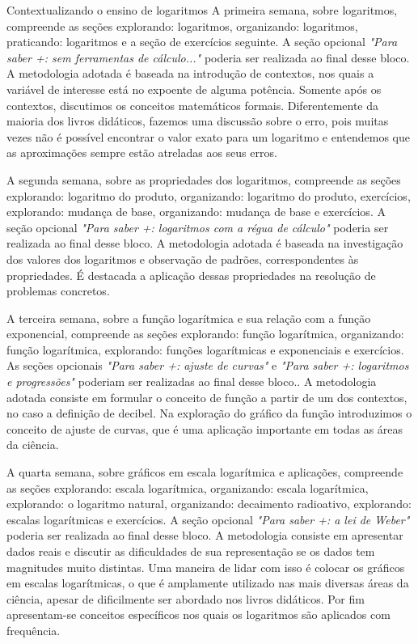 \begin{apresentacao}{Contextualizando o ensino de logaritmos}
A primeira semana, sobre logaritmos, compreende as seções explorando: logaritmos, organizando: logaritmos, praticando: logaritmos e a seção de exercícios seguinte. A seção opcional \textit{"Para saber +: sem ferramentas de cálculo..."} poderia ser realizada ao final desse bloco. A metodologia adotada é baseada na introdução de contextos, nos quais a variável de interesse está no expoente de alguma potência. Somente após os contextos, discutimos os conceitos matemáticos formais. Diferentemente da maioria dos livros didáticos, fazemos uma discussão sobre o erro, pois muitas vezes não é possível encontrar o valor exato para um logaritmo e entendemos que as aproximações sempre estão atreladas aos seus erros.

A segunda semana, sobre as propriedades dos logaritmos, compreende as seções explorando: logaritmo do produto, organizando: logaritmo do produto, exercícios, explorando: mudança de base, organizando: mudança de base e exercícios. A seção opcional \textit{"Para saber +: logaritmos com a régua de cálculo"} poderia ser realizada ao final desse bloco. A metodologia adotada é baseada na investigação dos valores dos logaritmos e observação de padrões, correspondentes às propriedades. É destacada a aplicação dessas propriedades na resolução de problemas concretos.

A terceira semana, sobre a função logarítmica e sua relação com a função exponencial, compreende as seções explorando: função logarítmica, organizando: função logarítmica, explorando: funções logarítmicas e exponenciais e exercícios. As seções opcionais \textit{"Para saber +: ajuste de curvas"} e \textit{"Para saber +: logaritmos e progressões"} poderiam ser realizadas ao final desse bloco.. A metodologia adotada consiste em formular o conceito de função a partir de um dos contextos, no caso a definição de decibel. Na exploração do gráfico da função introduzimos o conceito de ajuste de curvas, que é uma aplicação importante em todas as áreas da ciência.

A quarta semana, sobre gráficos em escala logarítmica e aplicações, compreende as seções explorando: escala logarítmica, organizando: escala logarítmica, explorando: o logaritmo natural, organizando: decaimento radioativo, explorando: escalas logarítmicas e exercícios. A seção opcional \textit{"Para saber +: a lei de Weber"} poderia ser realizada ao final desse bloco. A metodologia consiste em apresentar dados reais e discutir as dificuldades de sua representação se os dados tem magnitudes muito distintas. Uma maneira de lidar com isso é colocar os gráficos em escalas logarítmicas, o que é amplamente utilizado nas mais diversas áreas da ciência, apesar de dificilmente ser abordado nos livros didáticos. Por fim apresentam-se conceitos específicos nos quais os logaritmos são aplicados com frequência.


\end{apresentacao}
